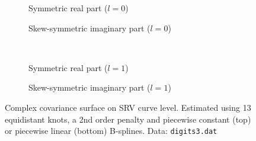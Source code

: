 \begin{figure}[t]
  \centering
  \begin{subfigure}{.48\textwidth}
    \centering
    \caption{Symmetric real part ($l = 0$)}
  \end{subfigure}\hfill%
  \begin{subfigure}{.48\textwidth}
    \centering
    \caption{Skew-symmetric imaginary part ($l = 0$)}
  \end{subfigure}\vspace{0.66em}\\
  \begin{subfigure}{.48\textwidth}
    \centering
    \caption{Symmetric real part ($l = 1$)}
  \end{subfigure}\hfill%
  \begin{subfigure}{.48\textwidth}
    \centering
    \caption{Skew-symmetric imaginary part ($l =1$)}
  \end{subfigure}
  \caption{Complex covariance surface on SRV curve level. Estimated using 13 equidistant knots, a 2nd order penalty and piecewise constant (top) or piecewise linear (bottom) B-splines. Data: \texttt{digits3.dat}}
  \label{fig:3-cov}
\end{figure}

